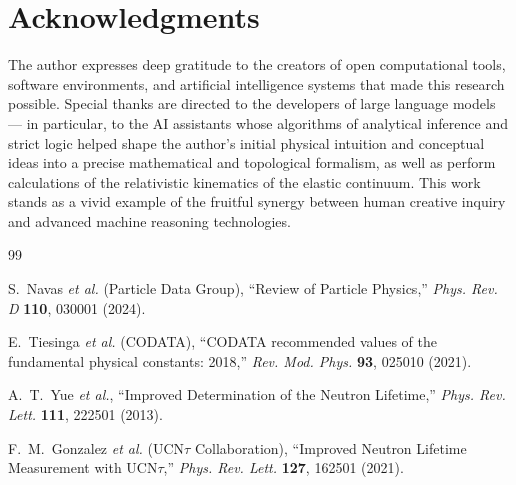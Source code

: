 \documentclass[12pt,a4paper]{article}
\begin{document}
\section*{Acknowledgments}
The author expresses deep gratitude to the creators of open computational tools, software environments, and artificial intelligence systems that made this research possible. Special thanks are directed to the developers of large language models — in particular, to the AI assistants whose algorithms of analytical inference and strict logic helped shape the author's initial physical intuition and conceptual ideas into a precise mathematical and topological formalism, as well as perform calculations of the relativistic kinematics of the elastic continuum. This work stands as a vivid example of the fruitful synergy between human creative inquiry and advanced machine reasoning technologies.

\begin{thebibliography}{99}

S.~Navas \textit{et al.} (Particle Data Group), ``Review of Particle Physics,'' \textit{Phys. Rev. D} \textbf{110}, 030001 (2024).

E.~Tiesinga \textit{et al.} (CODATA), ``CODATA recommended values of the fundamental physical constants: 2018,'' \textit{Rev. Mod. Phys.} \textbf{93}, 025010 (2021).

A.~T.~Yue \textit{et al.}, ``Improved Determination of the Neutron Lifetime,'' \textit{Phys. Rev. Lett.} \textbf{111}, 222501 (2013).

F.~M.~Gonzalez \textit{et al.} (UCN$\tau$ Collaboration), ``Improved Neutron Lifetime Measurement with UCN$\tau$,'' \textit{Phys. Rev. Lett.} \textbf{127}, 162501 (2021).

\end{thebibliography}	
\end{document}
